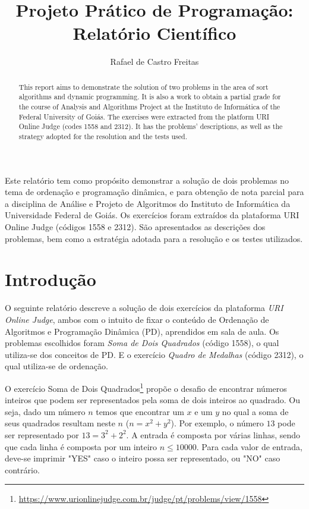 \documentclass[12pt]{article}
\title{Projeto Prático de Programação: Relatório Científico}
\author{Rafael de Castro Freitas\inst{1}}
\begin{document}
 

\maketitle

\begin{abstract}
This report aims to demonstrate the solution of two problems in the area of sort algorithms and dynamic programming. It is also a work to obtain a partial grade for the course of Analysis and Algorithms Project at the Instituto de Informática of the Federal University of Goiás. The exercises were extracted from the platform URI Online Judge (codes 1558 and 2312). It has the problems' descriptions, as well as the strategy adopted for the resolution and the tests used.
\end{abstract}
     
\begin{resumo} 
Este relatório tem como propósito demonstrar a solução de dois problemas no tema de ordenação e programação dinâmica, e para obtenção de nota parcial para a disciplina de Análise e Projeto de Algoritmos do Instituto de Informática da Universidade Federal de Goiás. Os exercícios foram extraídos da plataforma URI Online Judge (códigos 1558 e 2312). São apresentados as descrições dos problemas, bem como a estratégia adotada para a resolução e os testes utilizados.
\end{resumo}

\section{Introdução}
O seguinte relatório descreve a solução de dois exercícios da plataforma \textit{URI Online Judge}, ambos com o intuito de fixar o conteúdo de Ordenação de Algoritmos e Programação Dinâmica (PD), aprendidos em sala de aula. Os problemas escolhidos foram \textit{Soma de Dois Quadrados} (código 1558), o qual utiliza-se dos conceitos de PD. E o exercício \textit{Quadro de Medalhas} (código 2312), o qual utiliza-se de ordenação.

O exercício Soma de Dois Quadrados\footnote{\url{https://www.urionlinejudge.com.br/judge/pt/problems/view/1558}} propõe o desafio de encontrar números inteiros que podem ser representados pela soma de dois inteiros ao quadrado. Ou seja, dado um número $n$ temos que encontrar um $x$ e um $y$ no qual a soma de seus quadrados resultam neste $n$ ($n = x^2 + y^2$). Por exemplo, o número $13$ pode ser representado por $13 = 3^2 + 2^2$. A entrada é composta por várias linhas, sendo que cada linha é composta por um inteiro $n \leq 10000$. Para cada valor de entrada, deve-se imprimir "YES" caso o inteiro possa ser representado, ou "NO" caso contrário.
\end{document}
